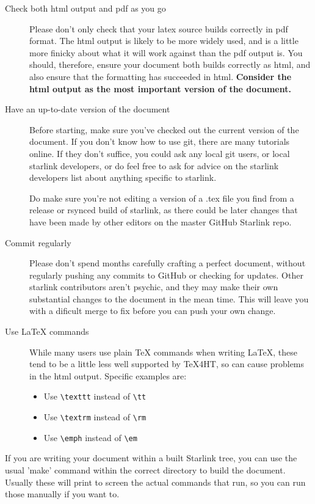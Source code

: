 \documentclass[twoside,11pt,nolof]{starlink}
\begin{document}
\begin{description}
\item[Check both html output and pdf as you go] Please don't only
  check that your latex source builds correctly in pdf format. The
  html output is likely to be more widely used, and is a little more
  finicky about what it will work against than the pdf output is. You
  should, therefore, ensure your document both builds correctly as
  html, and also ensure that the formatting has succeeded in
  html. \textbf{Consider the html output as the most important version
    of the document.}

\item[Have an up-to-date version of the document] Before starting,
  make sure you've checked out the current version of the document. If
  you don't know how to use git, there are many tutorials online. If
  they don't suffice, you could ask any local git users, or local
  starlink developers, or do feel free to ask for advice on the
  starlink developers list about anything specific to starlink.

  Do make sure you're not editing a version of a .tex file you find
  from a release or rsynced build of starlink, as there could be later
  changes that have been made by other editors on the master GitHub
  Starlink repo.

\item[Commit regularly] Please don't spend months carefully crafting a
  perfect document, without regularly pushing any commits to GitHub or
  checking for updates. Other starlink contributors aren't psychic,
  and they may make their own substantial changes to the document in
  the mean time. This will leave you with a dificult merge to fix
  before you can push your own change.

\item[Use LaTeX commands] While many users use plain TeX commands when
  writing \LaTeX, these tend to be a little less well supported by
  TeX4HT, so can cause problems in the html output. Specific examples are:
  \begin{itemize}
  \item Use \verb+\texttt+ instead of \verb+\tt+
  \item Use \verb+\textrm+ instead of \verb+\rm+
  \item Use \verb+\emph+ instead of \verb+\em+
  \end{itemize}
\end{description}


If you are writing your document within a built Starlink tree, you can
use the usual 'make' command within the correct directory to build
the document. Usually these will print to screen the actual commands
that run, so you can run those manually if you want to.
\end{document}
